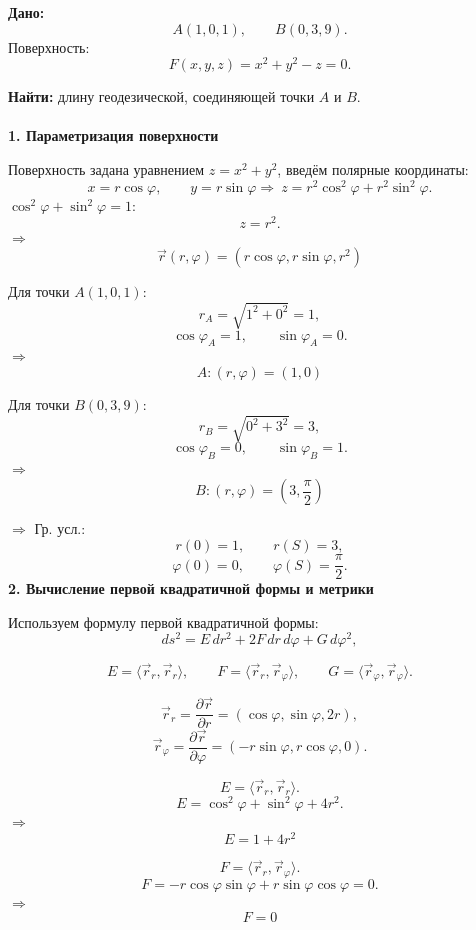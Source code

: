 \documentclass[12pt,a4paper]{article}
\begin{document}
\vspace{0.4cm}

\textbf{Дано:}
\[
A(1,0,1), \qquad B(0,3,9).
\]
Поверхность:
\[
F(x,y,z)=x^2+y^2-z=0.
\]

\textbf{Найти:} длину геодезической, соединяющей точки \(A\) и \(B\).\\

\textbf{\\1. Параметризация поверхности}

Поверхность задана уравнением \(z=x^2+y^2\), введём полярные координаты:
\[
x=r\cos\varphi,\qquad y=r\sin\varphi\Rightarrow\ z=r^2\cos^2\varphi+r^2\sin^2\varphi.
\]
\(\cos^2\varphi+\sin^2\varphi=1\):
\[
z=r^2.
\]
\(\Rightarrow\)\[
\boxed{\vec r(r,\varphi)=(r\cos\varphi,r\sin\varphi,r^2)}
\]

Для точки \(A(1,0,1)\):
\[
r_A=\sqrt{1^2+0^2}=1,
\]
\[
\cos\varphi_A=1,\qquad \sin\varphi_A=0.
\]
\(\Rightarrow\)
\[
\boxed{A:(r,\varphi)=\left(1,0\right)}
\]

Для точки \(B(0,3,9)\):
\[
r_B=\sqrt{0^2+3^2}=3,
\]
\[
\cos\varphi_B=0,\qquad \sin\varphi_B=1.
\]
\(\Rightarrow\)
\[
\boxed{B:(r,\varphi)=\left(3,\frac{\pi}{2}\right)}
\]

\(\Rightarrow\) Гр. усл.:
\[
r(0)=1,\qquad r(S)=3,
\]
\[
\varphi(0)=0,\qquad \varphi(S)=\frac{\pi}{2}.
\]
\newpage
\textbf{2. Вычисление первой квадратичной формы и метрики}

Используем формулу первой квадратичной формы:
\[
ds^2=E\,dr^2+2F\,dr\,d\varphi+G\,d\varphi^2,
\]

\[
E=\langle\vec r_r,\vec r_r\rangle,
\qquad
F=\langle\vec r_r,\vec r_\varphi\rangle,
\qquad
G=\langle\vec r_\varphi,\vec r_\varphi\rangle.
\]

\[
\vec r_r=\frac{\partial\vec r}{\partial r}=(\cos\varphi,\sin\varphi,2r),
\]
\[
\vec r_\varphi=\frac{\partial\vec r}{\partial\varphi}=(-r\sin\varphi,r\cos\varphi,0).
\]

\[
E=\langle\vec r_r,\vec r_r\rangle.
\]
\[
E=\cos^2\varphi+\sin^2\varphi+4r^2.
\]
\(\Rightarrow\)
\[
\boxed{E=1+4r^2}
\]

\[
F=\langle\vec r_r,\vec r_\varphi\rangle.
\]
\[
F=-r\cos\varphi\sin\varphi+r\sin\varphi\cos\varphi=0.
\]
\(\Rightarrow\)
\[
\boxed{F=0}
\]
\end{document}
